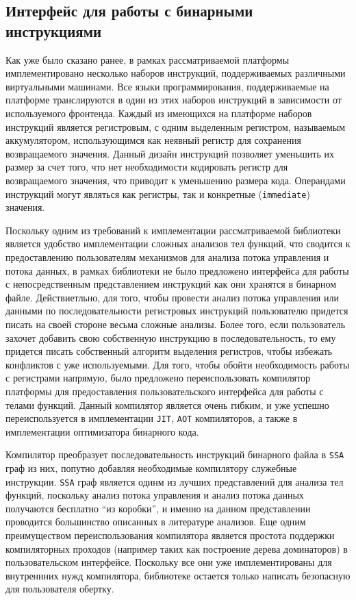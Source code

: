 \subsection{Интерфейс для работы с бинарными инструкциями}

Как уже было сказано ранее, в рамках рассматриваемой платформы имплементировано несколько наборов инструкций, поддерживаемых различными виртуальными машинами. Все языки программирования, поддерживаемые на платформе транслируются в один из этих наборов инструкций в зависимости от используемого фронтенда. Каждый из имеющихся на платформе наборов инструкций является регистровым, с одним выделенным регистром, называемым аккумулятором, использующимся как неявный регистр для сохранения возвращаемого значения. Данный дизайн инструкций позволяет уменьшить их размер за счет того, что нет необходимости кодировать регистр для возвращаемого значения, что приводит к уменьшению размера кода. Операндами инструкций могут являться как регистры, так и конкретные (\texttt{immediate}) значения.

Поскольку одним из требований к имплементации рассматриваемой библиотеки является удобство имплементации сложных анализов тел функций, что сводится к предоставлению пользователям механизмов для анализа потока управления и потока данных, в рамках библиотеки не было предложено интерфейса для работы с непосредственным представлением инструкций как они хранятся в бинарном файле. Действиетльно, для того, чтобы провести анализ потока управления или данными по последовательности регистровых инструкций пользователю придется писать на своей стороне весьма сложные анализы. Более того, если пользователь захочет добавить свою собственную инструкцию в последовательность, то ему придется писать собственный алгоритм выделения регистров, чтобы избежать конфликтов с уже используемыми. Для того, чтобы обойти необходимость работы с регистрами напрямую, было предложено переиспользовать компилятор платформы для предоставления пользовательского интерфейса для работы с телами функций. Данный компилятор является очень гибким, и уже успешно переиспользуется в имплементации \texttt{JIT}, \texttt{AOT} компиляторов, а также в имплементации оптимизатора бинарного кода.

Компилятор преобразует последовательность инструкций бинарного файла в \texttt{SSA} граф из них, попутно добавляя необходимые компилятору служебные инструкции. \texttt{SSA} граф является одинм из лучших представлений для анализа тел функций, поскольку анализ потока управления и анализ потока данных получаются бесплатно ``из коробки'', и именно на данном представлении проводится большинство описанных в литературе анализов. Еще одним преимуществом переиспользования компилятора является простота поддержки компиляторных проходов (например таких как построение дерева доминаторов) в пользовательском интерфейсе. Поскольку все они уже имплементированы для внутреннних нужд компилятора, библиотеке остается только написать безопасную для пользователя обертку.

